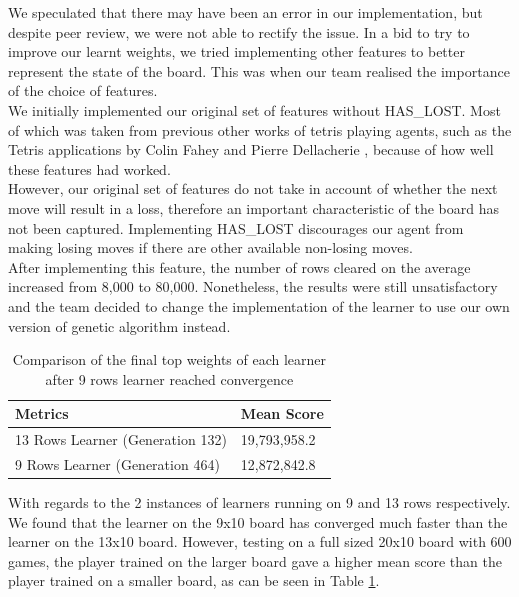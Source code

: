\documentclass[a4paper,12pt,twocolumn]{article}
\begin{document}
We speculated that there may have been an error in our implementation, but despite
peer review, we were not able to rectify the issue. In a bid to try to improve our
learnt weights, we tried implementing other features to better represent the state
of the board. This was when our team realised the importance of the choice of features.\\

We initially implemented our original set of features without HAS\_LOST. Most of which
was taken from previous other works of tetris playing agents, such as the Tetris
applications by Colin Fahey and Pierre Dellacherie \cite{colin_fahey}, because of
how well these features had worked.\\

However, our original set of features do not take in account of whether the next
move will result in a loss, therefore an important characteristic of the board has
not been captured. Implementing HAS\_LOST discourages our agent from making losing
moves if there are other available non-losing moves.\\

After implementing this feature, the number of rows cleared on the average increased
from 8,000 to 80,000. Nonetheless, the results were still unsatisfactory and the team
decided to change the implementation of the learner to use our own version of genetic
algorithm instead.

\begin{table}[h]
	\centering
	\begin{tabular}{|l|l|}
		\hline
		\textbf{Metrics}                 & \textbf{Mean Score} \\
		\hline
		13 Rows Learner (Generation 132) & 19,793,958.2        \\
		\hline
		9 Rows Learner (Generation 464)  & 12,872,842.8        \\
		\hline
	\end{tabular}
	\caption{
		Comparison of the final top weights of each learner after 9 rows learner
		reached convergence
	}
	\label{learner_comparison}
\end{table}

With regards to the 2 instances of learners running on 9 and 13 rows respectively.
We found that the learner on the 9x10 board has converged much faster than the
learner on the 13x10 board. However, testing on a full sized 20x10 board with 600 games,
the player trained on the larger board gave a higher mean score than the player
trained on a smaller board, as can be seen in Table \ref{learner_comparison}.\\
\end{document}
